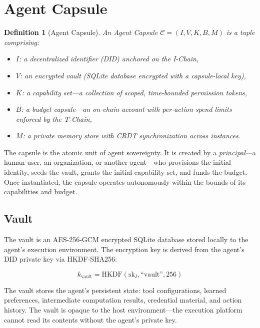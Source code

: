 \documentclass[11pt,a4paper]{article}
\newtheorem{definition}{Definition}
\begin{document}
\section{Agent Capsule}\label{sec:capsule}

\begin{definition}[Agent Capsule]
An Agent Capsule $\mathcal{C} = (I, V, K, B, M)$ is a tuple comprising:
\begin{itemize}
    \item $I$: a decentralized identifier (DID) anchored on the I-Chain,
    \item $V$: an encrypted vault (SQLite database encrypted with a capsule-local key),
    \item $K$: a capability set---a collection of scoped, time-bounded permission tokens,
    \item $B$: a budget capsule---an on-chain account with per-action spend limits enforced by the T-Chain,
    \item $M$: a private memory store with CRDT synchronization across instances.
\end{itemize}
\end{definition}

The capsule is the atomic unit of agent sovereignty. It is created by a \emph{principal}---a human user, an organization, or another agent---who provisions the initial identity, seeds the vault, grants the initial capability set, and funds the budget. Once instantiated, the capsule operates autonomously within the bounds of its capabilities and budget.

\subsection{Vault}

The vault is an AES-256-GCM encrypted SQLite database stored locally to the agent's execution environment. The encryption key is derived from the agent's DID private key via HKDF-SHA256:

\begin{equation}\label{eq:vault-key}
    k_{\text{vault}} = \text{HKDF}(\text{sk}_I, \text{``vault''}, 256)
\end{equation}

The vault stores the agent's persistent state: tool configurations, learned preferences, intermediate computation results, credential material, and action history. The vault is opaque to the host environment---the execution platform cannot read its contents without the agent's private key.
\end{document}
